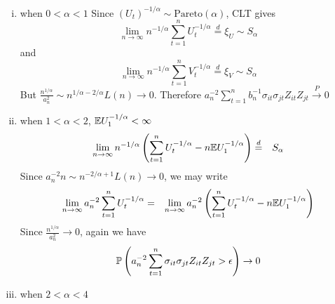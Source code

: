 \documentclass{article}
\begin{document}
\begin{enumerate}[(i)]
\item when $0 < \alpha < 1$
  Since $(U_t)^{-1/\alpha} \sim \text{Pareto}(\alpha)$, CLT gives
  \[
  \lim_{n\to \infty} n^{-1/\alpha} \sum_{t=1}^{n}
  U_t^{-1/\alpha} \overset{d}{=} \xi_U \sim S_{\alpha}
  \]
and 
  \[
  \lim_{n\to \infty} n^{-1/\alpha} \sum_{t=1}^{n}
  V_t^{-1/\alpha} \overset{d}{=} \xi_V \sim S_{\alpha}
  \]
  But $\frac{n^{1/\alpha}}{a_n^2} \sim n^{1/\alpha - 2/\alpha} L(n)
  \to 0$. Therefore $a_n^{-2}\sum_{t=1}^{n} b_n^{-1} \sigma_{it}
  \sigma_{jt} Z_{it} Z_{jt} \overset{P}{\to} 0$
\item when $1 < \alpha < 2$, $\E U_1^{-1/\alpha} < \infty$
  \begin{eqnarray*}
    \lim_{n\to \infty} n^{-1/\alpha} \left( \sum_{t=1}^{n}
      U_t^{-1/\alpha} - n \E U_1^{-1/\alpha}\right) &\overset{d}{=}&
    S_{\alpha}
  \end{eqnarray*}
  Since $a_n^{-2} n \sim n^{-2/\alpha + 1} L(n) \to 0$, we may write
  \begin{eqnarray*}
    \lim_{n \to \infty} a_n^{-2} \sum_{t=1}^{n}U_t^{-1/\alpha} &=&
    \lim_{n \to \infty} a_n^{-2}\left( \sum_{t=1}^{n} U_t^{-1/\alpha}
      - n \E U_1^{-1/\alpha}\right)
  \end{eqnarray*}
  Since $\frac{n^{1/\alpha}}{a_n^2} \to 0$, again we have
  \[
  \P\left( a_n^{-2} \sum_{t=1}^{n} \sigma_{it} \sigma_{jt} Z_{it}
    Z_{jt} > \epsilon\right) \to 0
\]
\item when $2 < \alpha < 4$
\end{enumerate}
\end{document}
